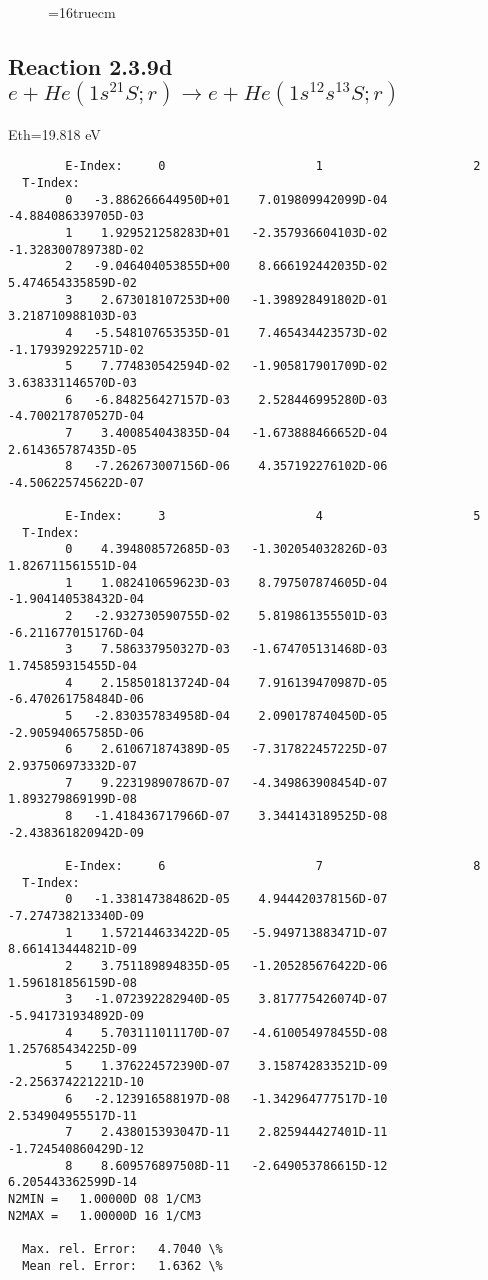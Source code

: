 \documentclass[12pt,dvipdfmx]{article}
\begin{document}
\begin{figure} \label{2.3.9c}
\epsfxsize=16truecm
\end{figure}
\newpage

\subsection{
Reaction 2.3.9d $ e + He(1s^21S;r) \rightarrow e + He(1s^12s^13S;r) $
}
Eth=19.818 eV



\begin{small}\begin{verbatim}
        E-Index:     0                     1                     2
  T-Index:
        0   -3.886266644950D+01    7.019809942099D-04   -4.884086339705D-03
        1    1.929521258283D+01   -2.357936604103D-02   -1.328300789738D-02
        2   -9.046404053855D+00    8.666192442035D-02    5.474654335859D-02
        3    2.673018107253D+00   -1.398928491802D-01    3.218710988103D-03
        4   -5.548107653535D-01    7.465434423573D-02   -1.179392922571D-02
        5    7.774830542594D-02   -1.905817901709D-02    3.638331146570D-03
        6   -6.848256427157D-03    2.528446995280D-03   -4.700217870527D-04
        7    3.400854043835D-04   -1.673888466652D-04    2.614365787435D-05
        8   -7.262673007156D-06    4.357192276102D-06   -4.506225745622D-07

        E-Index:     3                     4                     5
  T-Index:
        0    4.394808572685D-03   -1.302054032826D-03    1.826711561551D-04
        1    1.082410659623D-03    8.797507874605D-04   -1.904140538432D-04
        2   -2.932730590755D-02    5.819861355501D-03   -6.211677015176D-04
        3    7.586337950327D-03   -1.674705131468D-03    1.745859315455D-04
        4    2.158501813724D-04    7.916139470987D-05   -6.470261758484D-06
        5   -2.830357834958D-04    2.090178740450D-05   -2.905940657585D-06
        6    2.610671874389D-05   -7.317822457225D-07    2.937506973332D-07
        7    9.223198907867D-07   -4.349863908454D-07    1.893279869199D-08
        8   -1.418436717966D-07    3.344143189525D-08   -2.438361820942D-09

        E-Index:     6                     7                     8
  T-Index:
        0   -1.338147384862D-05    4.944420378156D-07   -7.274738213340D-09
        1    1.572144633422D-05   -5.949713883471D-07    8.661413444821D-09
        2    3.751189894835D-05   -1.205285676422D-06    1.596181856159D-08
        3   -1.072392282940D-05    3.817775426074D-07   -5.941731934892D-09
        4    5.703111011170D-07   -4.610054978455D-08    1.257685434225D-09
        5    1.376224572390D-07    3.158742833521D-09   -2.256374221221D-10
        6   -2.123916588197D-08   -1.342964777517D-10    2.534904955517D-11
        7    2.438015393047D-11    2.825944427401D-11   -1.724540860429D-12
        8    8.609576897508D-11   -2.649053786615D-12    6.205443362599D-14
N2MIN =   1.00000D 08 1/CM3
N2MAX =   1.00000D 16 1/CM3

  Max. rel. Error:   4.7040 \%
  Mean rel. Error:   1.6362 \%



\end{verbatim}\end{small}
\end{document}
